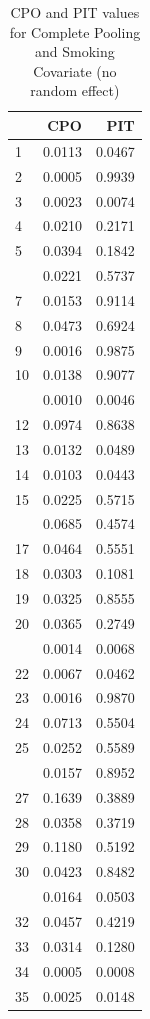 \documentclass[
]{article}
\begin{document}
\begin{table}

\caption{\label{tab:unnamed-chunk-7}CPO and PIT values for Complete Pooling and Smoking 
    Covariate (no random effect)}
\centering
\begin{tabular}[t]{lrr}
\toprule
  & CPO & PIT\\
\midrule
1 & 0.0113 & 0.0467\\
2 & 0.0005 & 0.9939\\
3 & 0.0023 & 0.0074\\
4 & 0.0210 & 0.2171\\
5 & 0.0394 & 0.1842\\
\addlinespace
6 & 0.0221 & 0.5737\\
7 & 0.0153 & 0.9114\\
8 & 0.0473 & 0.6924\\
9 & 0.0016 & 0.9875\\
10 & 0.0138 & 0.9077\\
\addlinespace
11 & 0.0010 & 0.0046\\
12 & 0.0974 & 0.8638\\
13 & 0.0132 & 0.0489\\
14 & 0.0103 & 0.0443\\
15 & 0.0225 & 0.5715\\
\addlinespace
16 & 0.0685 & 0.4574\\
17 & 0.0464 & 0.5551\\
18 & 0.0303 & 0.1081\\
19 & 0.0325 & 0.8555\\
20 & 0.0365 & 0.2749\\
\addlinespace
21 & 0.0014 & 0.0068\\
22 & 0.0067 & 0.0462\\
23 & 0.0016 & 0.9870\\
24 & 0.0713 & 0.5504\\
25 & 0.0252 & 0.5589\\
\addlinespace
26 & 0.0157 & 0.8952\\
27 & 0.1639 & 0.3889\\
28 & 0.0358 & 0.3719\\
29 & 0.1180 & 0.5192\\
30 & 0.0423 & 0.8482\\
\addlinespace
31 & 0.0164 & 0.0503\\
32 & 0.0457 & 0.4219\\
33 & 0.0314 & 0.1280\\
34 & 0.0005 & 0.0008\\
35 & 0.0025 & 0.0148\\

\end{tabular}
\end{table}
\end{document}
